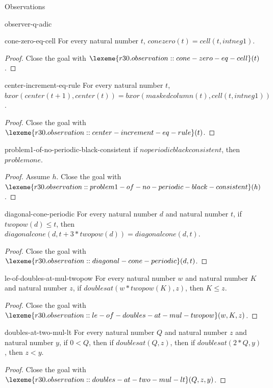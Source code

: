 \begin{lexlean}{Observations}
\begin{section}{observer-q-adic}
\begin{theorem}{cone-zero-eq-cell}
For every natural number \(t\), \(conezero(t) = cell(t, intneg 1)\).
\begin{proof}
Close the goal with \(\lexeme{r30.observation::cone-zero-eq-cell}(t)\).
\end{proof}
\end{theorem}

\begin{theorem}{center-increment-eq-rule}
For every natural number \(t\), \(bxor(center(t + 1), center(t)) = bxor(maskedcolumn(t), cell(t, intneg 1))\).
\begin{proof}
Close the goal with \(\lexeme{r30.observation::center-increment-eq-rule}(t)\).
\end{proof}
\end{theorem}

\begin{theorem}{problem1-of-no-periodic-black-consistent}
if \(noperiodicblackconsistent\), then \(problemone\).
\begin{proof}
Assume \(h\).
Close the goal with \(\lexeme{r30.observation::problem1-of-no-periodic-black-consistent}(h)\).
\end{proof}
\end{theorem}

\begin{theorem}{diagonal-cone-periodic}
For every natural number \(d\) and natural number \(t\), if \(twopow(d) ≤ t\), then \(diagonalcone(d, t + 3 * twopow(d)) = diagonalcone(d, t)\).
\begin{proof}
Close the goal with \(\lexeme{r30.observation::diagonal-cone-periodic}(d, t)\).
\end{proof}
\end{theorem}

\begin{theorem}{le-of-doubles-at-mul-twopow}
For every natural number \(w\) and natural number \(K\) and natural number \(z\), if \(doublesat(w * twopow(K), z)\), then \(K ≤ z\).
\begin{proof}
Close the goal with \(\lexeme{r30.observation::le-of-doubles-at-mul-twopow}(w, K, z)\).
\end{proof}
\end{theorem}

\begin{theorem}{doubles-at-two-mul-lt}
For every natural number \(Q\) and natural number \(z\) and natural number \(y\), if \(0 < Q\), then if \(doublesat(Q, z)\), then if \(doublesat(2 * Q, y)\), then \(z < y\).
\begin{proof}
Close the goal with \(\lexeme{r30.observation::doubles-at-two-mul-lt}(Q, z, y)\).
\end{proof}
\end{theorem}


\end{section}
\end{lexlean}
